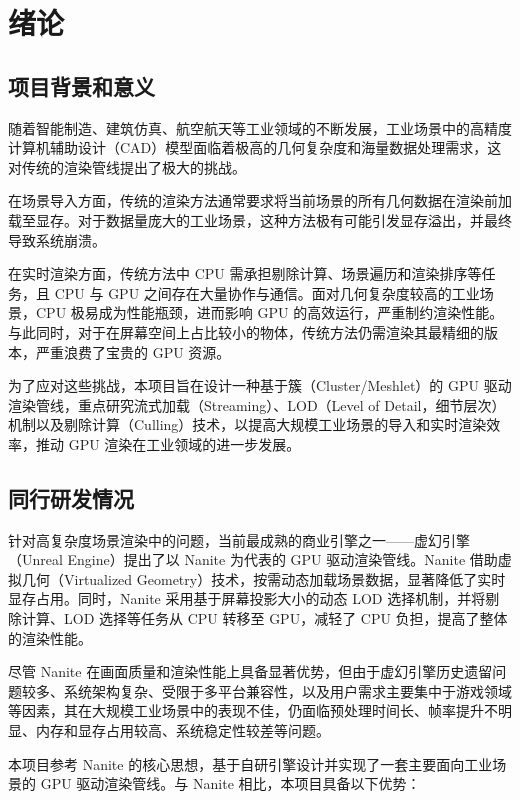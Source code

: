 \cleardoublepage

\section{绪论}

\subsection{项目背景和意义}
随着智能制造、建筑仿真、航空航天等工业领域的不断发展，工业场景中的高精度计算机辅助设计（CAD）模型面临着极高的几何复杂度和海量数据处理需求\cite{CAD}，这对传统的渲染管线提出了极大的挑战。

在场景导入方面，传统的渲染方法通常要求将当前场景的所有几何数据在渲染前加载至显存。对于数据量庞大的工业场景，这种方法极有可能引发显存溢出，并最终导致系统崩溃。

在实时渲染方面，传统方法中 CPU 需承担剔除计算、场景遍历和渲染排序等任务，且 CPU 与 GPU 之间存在大量协作与通信。面对几何复杂度较高的工业场景，CPU 极易成为性能瓶颈，进而影响 GPU 的高效运行，严重制约渲染性能\cite{WangWei2011}\cite{Tian2024}。与此同时，对于在屏幕空间上占比较小的物体，传统方法仍需渲染其最精细的版本，严重浪费了宝贵的 GPU 资源。

为了应对这些挑战，本项目旨在设计一种基于簇（Cluster/Meshlet）的 GPU 驱动渲染管线，重点研究流式加载（Streaming）、LOD（Level of Detail，细节层次）机制以及剔除计算（Culling）技术，以提高大规模工业场景的导入和实时渲染效率，推动 GPU 渲染在工业领域的进一步发展。

\subsection{同行研发情况}

针对高复杂度场景渲染中的问题，当前最成熟的商业引擎之一——虚幻引擎（Unreal Engine）提出了以 Nanite 为代表的 GPU 驱动渲染管线\cite{Nanite2022}。Nanite 借助虚拟几何（Virtualized Geometry）技术，按需动态加载场景数据，显著降低了实时显存占用。同时，Nanite 采用基于屏幕投影大小的动态 LOD 选择机制\cite{Overton2024}，并将剔除计算、LOD 选择等任务从 CPU 转移至 GPU，减轻了 CPU 负担，提高了整体的渲染性能。

尽管 Nanite 在画面质量和渲染性能上具备显著优势，但由于虚幻引擎历史遗留问题较多、系统架构复杂、受限于多平台兼容性，以及用户需求主要集中于游戏领域等因素，其在大规模工业场景中的表现不佳，仍面临预处理时间长、帧率提升不明显、内存和显存占用较高、系统稳定性较差等问题\cite{mattrg2023}。

本项目参考 Nanite 的核心思想，基于自研引擎设计并实现了一套主要面向工业场景的 GPU 驱动渲染管线。与 Nanite 相比，本项目具备以下优势：

